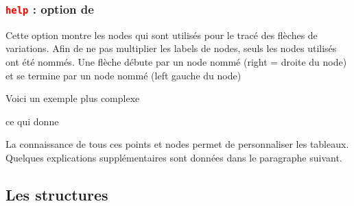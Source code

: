 \subsubsection{\texttt{\textcolor{red}{help}} :  option de }
Cette option montre les nodes qui sont utilisés pour le tracé des flèches de variations. Afin de ne pas multiplier les labels de nodes, seuls les nodes utilisés ont été nommés. Une flèche débute par un node  nommé  (right = droite du node) et se termine par un node nommé  (left gauche du node)
\begin{tkzexample}[small]
\end{tkzexample}

Voici un exemple plus complexe

\begin{tkzexample}[small]
\end{tkzexample}

ce qui donne
\begin{tkzexample}[small]
\end{tkzexample}

La connaissance de tous ces points et nodes permet de personnaliser les tableaux. Quelques explications supplémentaires sont données dans le paragraphe suivant.

\subsection{Les structures}
